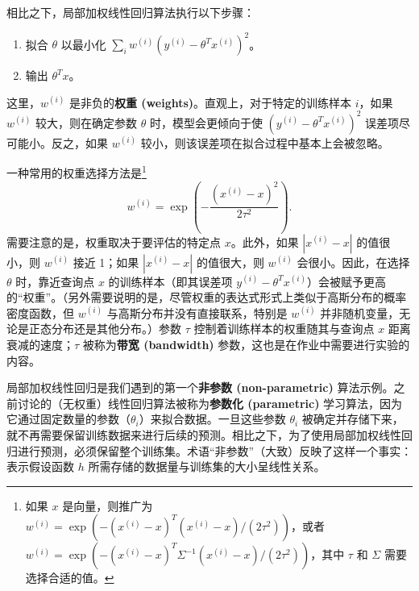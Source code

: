 相比之下，局部加权线性回归算法执行以下步骤：

\begin{enumerate}
    \item 拟合 $\theta$ 以最小化 $\sum_i w^{(i)} (y^{(i)} - \theta^T x^{(i)})^2$。
    \item 输出 $\theta^T x$。
\end{enumerate}

这里，$w^{(i)}$ 是非负的\textbf{权重 (weights)}。直观上，对于特定的训练样本 $i$，如果 $w^{(i)}$ 较大，则在确定参数 $\theta$ 时，模型会更倾向于使 $(y^{(i)} - \theta^T x^{(i)})^2$ 误差项尽可能小。反之，如果 $w^{(i)}$ 较小，则该误差项在拟合过程中基本上会被忽略。

一种常用的权重选择方法是\footnote{如果 $x$ 是向量，则推广为 $w^{(i)} = \exp(-(x^{(i)} - x)^T (x^{(i)} - x) / (2\tau^2))$，或者 $w^{(i)} = \exp(-(x^{(i)} - x)^T \Sigma^{-1} (x^{(i)} - x) / (2\tau^2))$，其中 $\tau$ 和 $\Sigma$ 需要选择合适的值。}
\[
    w^{(i)} = \exp\left(-\frac{(x^{(i)} - x)^2}{2\tau^2}\right).
\]
需要注意的是，权重取决于要评估的特定点 $x$。此外，如果 $|x^{(i)} - x|$ 的值很小，则 $w^{(i)}$ 接近 1；如果 $|x^{(i)} - x|$ 的值很大，则 $w^{(i)}$ 会很小。因此，在选择 $\theta$ 时，靠近查询点 $x$ 的训练样本（即其误差项 $y^{(i)} - \theta^T x^{(i)}$）会被赋予更高的“权重”。（另外需要说明的是，尽管权重的表达式形式上类似于高斯分布的概率密度函数，但 $w^{(i)}$ 与高斯分布并没有直接联系，特别是 $w^{(i)}$ 并非随机变量，无论是正态分布还是其他分布。）参数 $\tau$ 控制着训练样本的权重随其与查询点 $x$ 距离衰减的速度；$\tau$ 被称为\textbf{带宽 (bandwidth)} 参数，这也是在作业中需要进行实验的内容。

局部加权线性回归是我们遇到的第一个\textbf{非参数 (non-parametric)} 算法示例。之前讨论的（无权重）线性回归算法被称为\textbf{参数化 (parametric)} 学习算法，因为它通过固定数量的参数（$\theta_i$）来拟合数据。一旦这些参数 $\theta_i$ 被确定并存储下来，就不再需要保留训练数据来进行后续的预测。相比之下，为了使用局部加权线性回归进行预测，必须保留整个训练集。术语“非参数”（大致）反映了这样一个事实：表示假设函数 $h$ 所需存储的数据量与训练集的大小呈线性关系。